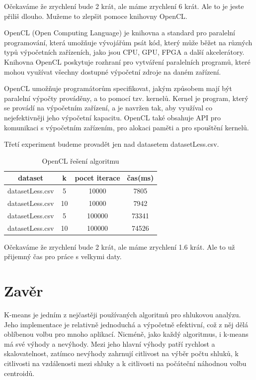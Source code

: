 \documentclass[czech,bachelor]{seminarka}
\begin{document}
Očekaváme že zrychlení bude 2 krát, ale máme zrychlení 6 krát. Ale to je jeste přiliš dlouho. Mužeme to zlepšit pomoce knihovny OpenCL.

OpenCL (Open Computing Language) je knihovna a standard pro paralelní programování, která umožňuje vývojářům psát kód, který může běžet na různých typů výpočetních zařízeních, jako jsou CPU, GPU, FPGA a další akcelerátory. Knihovna OpenCL poskytuje rozhraní pro vytváření paralelních programů, které mohou využívat všechny dostupné výpočetní zdroje na daném zařízení.

OpenCL umožňuje programátorům specifikovat, jakým způsobem mají být paralelní výpočty prováděny, a to pomocí tzv. kernelů. Kernel je program, který se provádí na výpočetním zařízení, a je navržen tak, aby využíval co nejefektivněji jeho výpočetní kapacitu. OpenCL také obsahuje API pro komunikaci s výpočetním zařízením, pro alokaci paměti a pro spouštění kernelů.

Třetí experiment budeme provadět jen nad datasetem datasetLess.csv.
\begin{table}[htbp]
\centering
\label{tab:sequence}
\begin{tabular}{ |c|c|c|c| } 
 \hline
 dataset & k & pocet iterace & čas(ms) \\ 
 \hline
 datasetLess.csv & 5 & 10000 & 7805 \\
 datasetLess.csv & 10 & 10000 & 7942 \\
 datasetLess.csv & 5 & 100000 & 73341 \\  
 datasetLess.csv & 10 & 100000 & 74526 \\  
 \hline
\end{tabular}
\caption{OpenCL řešení algoritmu}
\end{table}

Očekaváme že zrychlení bude 2 krát, ale máme zrychlení 1.6 krát. Ale to už přijemný čas pro práce s velkymi daty.

\chapter{Zavěr}

K-means je jedním z nejčastěji používaných algoritmů pro shlukovou analýzu. Jeho implementace je relativně jednoduchá a výpočetně efektivní, což z něj dělá oblíbenou volbu pro mnoho aplikací. Nicméně, jako každý algoritmus, i k-means má své výhody a nevýhody. Mezi jeho hlavní výhody patří rychlost a skalovatelnost, zatímco nevýhody zahrnují citlivost na výběr počtu shluků, k citlivosti na vzdálenosti mezi shluky a k citlivosti na počáteční náhodnou volbu centroidů.
\end{document}
